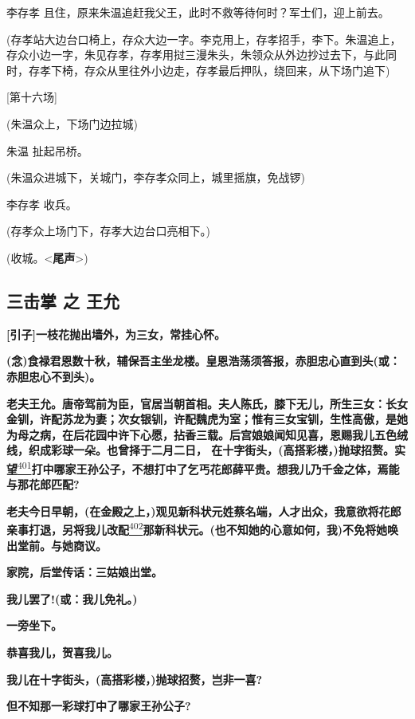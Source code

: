 李存孝 且住，原来朱温追赶我父王，此时不救等待何时？军士们，迎上前去。

(存孝站大边台口椅上，存众大边一字。李克用上，存孝招手，李下。朱温追上，存众小边一字，朱见存孝，存孝用挝三漫朱头，朱领众从外边抄过去下，与此同时，存孝下椅，存众从里往外小边走，存孝最后押队，绕回来，从下场门追下)

{[}第十六场{]}

(朱温众上，下场门边拉城)

朱温 扯起吊桥。

(朱温众进城下，关城门，李存孝众同上，城里摇旗，免战锣)

李存孝 收兵。

(存孝众上场门下，存孝大边台口亮相下。)

(收城。\textless{}\textbf{尾声}\textgreater{})

\newpage
\hypertarget{ux4e09ux51fbux638c-ux4e4b-ux738bux5141}{%
\subsection{三击掌 之
王允}\label{ux4e09ux51fbux638c-ux4e4b-ux738bux5141}}

\textbf{{[}引子{]}一枝花抛出墙外，为三女，常挂心怀。}

\textbf{(念)食禄君恩数十秋，辅保吾主坐龙楼。皇恩浩荡须答报，赤胆忠心直到头(或：赤胆忠心不到头)。}

\textbf{老夫王允。唐帝驾前为臣，官居当朝首相。夫人陈氏，膝下无儿，所生三女：长女金钏，许配苏龙为妻；次女银钏，许配魏虎为室；惟有三女宝钏，生性高傲，是她为母之病，在后花园中许下心愿，拈香三载。后宫娘娘闻知见喜，恩赐我儿五色绒线，织成彩球一朵。也曾择于二月二日，
在十字街头，(高搭彩楼，)抛球招赘。实望}\protect\hyperlink{fn401}{\textsuperscript{401}}\textbf{打中哪家王孙公子，不想打中了乞丐花郎薛平贵。想我儿乃千金之体，焉能与那花郎匹配?}

\textbf{老夫今日早朝，(在金殿之上，)观见新科状元姓蔡名端，人才出众，我意欲将花郎亲事打退，另将我儿改配}\protect\hyperlink{fn402}{\textsuperscript{402}}\textbf{那新科状元。(也不知她的心意如何，我)不免将她唤出堂前。与她商议。}

\textbf{家院，后堂传话：三姑娘出堂。}

\textbf{我儿罢了!(或：我儿免礼。)}

\textbf{一旁坐下。}

\textbf{恭喜我儿，贺喜我儿。}

\textbf{我儿在十字街头，(高搭彩楼，)抛球招赘，岂非一喜?}

\textbf{但不知那一彩球打中了哪家王孙公子?}

